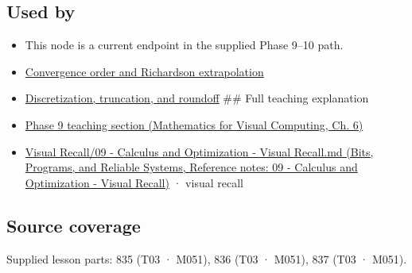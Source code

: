 \subsection{Used by}\label{appendix-80521eae6b71-used-by}

\begin{itemize}
\item
  This node is a current endpoint in the supplied Phase 9--10 path.
\item
  \hyperref[appendix-aca80b6bf17a]{Convergence order and Richardson extrapolation}
\item
  \hyperref[appendix-6b0648b2b8e8]{Discretization, truncation, and roundoff} \#\# Full teaching explanation
\item
  \href{../02-Mathematics-for-Visual-Computing/main.pdf\#nameddest=02-foundations-ii-ch022-integration-and-quadrature}{Phase 9 teaching section (Mathematics for Visual Computing, Ch. 6)}
\item
  \href{../01-Bits-Programs-and-Reliable-Systems/main.pdf\#nameddest=appendix-adf48f5dc5c1}{Visual Recall/09 - Calculus and Optimization - Visual Recall.md (Bits, Programs, and Reliable Systems, Reference notes: 09 - Calculus and Optimization - Visual Recall)} · visual recall
\end{itemize}

\subsection{Source coverage}\label{appendix-80521eae6b71-source-coverage}

Supplied lesson parts: 835 (T03 · M051), 836 (T03 · M051), 837 (T03 · M051).
